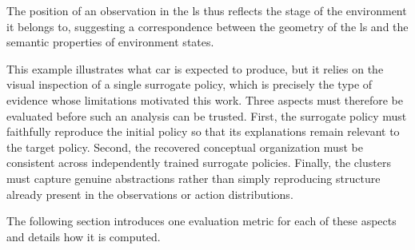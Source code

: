 

The position of an observation in the \gls{ls} thus reflects the stage of the environment it belongs to, suggesting a correspondence between the geometry of the \gls{ls} and the semantic properties of environment states.

This example illustrates what \gls{car} is expected to produce, but it relies on the visual inspection of a single surrogate policy, which is precisely the type of evidence whose limitations motivated this work.
Three aspects must therefore be evaluated before such an analysis can be trusted.
First, the surrogate policy must faithfully reproduce the initial policy so that its explanations remain relevant to the target policy.
Second, the recovered conceptual organization must be consistent across independently trained surrogate policies.
Finally, the clusters must capture genuine abstractions rather than simply reproducing structure already present in the observations or action distributions.

The following section introduces one evaluation metric for each of these aspects and details how it is computed.

